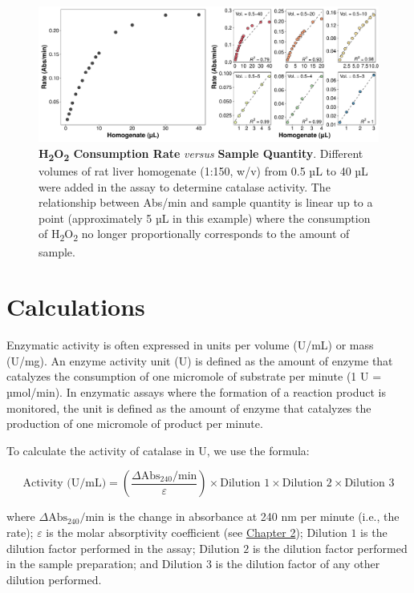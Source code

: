 \documentclass[
  9pt,
  american,
  a5paper,
  extrafontsizes,onecolumn,openright
  ]{memoir}
\newlength{\rf}
\begin{document}
\scriptsize

\begin{figure}

\includegraphics[width=1\linewidth]{Volume-1_files/figure-latex/fig-cat-linear-range-1} \hfill{}

\caption{\textbf{H\textsubscript{2}O\textsubscript{2} Consumption Rate} \emph{versus} \textbf{Sample Quantity}. Different volumes of rat liver homogenate (1:150, w/v) from 0.5 µL to 40 µL were added in the assay to determine catalase activity. The relationship between Abs/min and sample quantity is linear up to a point (approximately 5 µL in this example) where the consumption of H\textsubscript{2}O\textsubscript{2} no longer proportionally corresponds to the amount of sample.}\label{fig:fig-cat-linear-range}
\end{figure}

\normalsize

\section{Calculations}\label{calculations}

Enzymatic activity is often expressed in units per volume (U/mL) or mass (U/mg). An enzyme activity unit (U) is defined as the amount of enzyme that catalyzes the consumption of one micromole of substrate per minute (1 U = µmol/min). In enzymatic assays where the formation of a reaction product is monitored, the unit is defined as the amount of enzyme that catalyzes the production of one micromole of product per minute.

To calculate the activity of catalase in U, we use the formula:

\[ 
\text{Activity (U/mL)} = \left( \frac{\Delta \text{Abs}_{240}/\text{min}}{\varepsilon} \right) \times \text{Dilution 1} \times \text{Dilution 2} \times \text{Dilution 3}
\]

where \(\Delta \text{Abs}_{240}/\text{min}\) is the change in absorbance at 240 nm per minute (i.e., the rate); \(\varepsilon\) is the molar absorptivity coefficient (see \hyperref[chapter2]{Chapter 2}); \(\text{Dilution 1}\) is the dilution factor performed in the assay; \(\text{Dilution 2}\) is the dilution factor performed in the sample preparation; and \(\text{Dilution 3}\) is the dilution factor of any other dilution performed.
\end{document}

